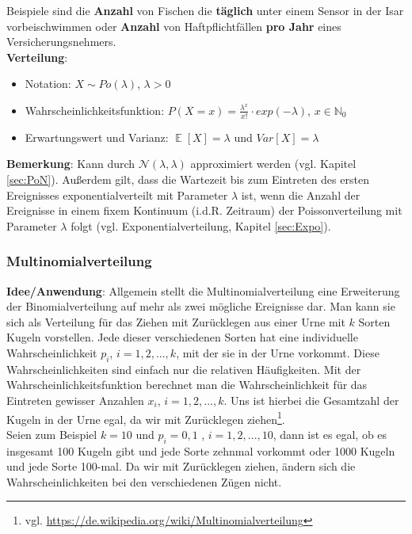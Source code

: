 \documentclass[a4paper]{article}
\DeclareMathOperator*{\E}{\mathbb{E}}
\begin{document}
\noindent Beispiele sind die \textbf{Anzahl} von Fischen die \textbf{täglich} unter einem Sensor in der Isar vorbeischwimmen oder \textbf{Anzahl} von Haftpflichtfällen \textbf{pro Jahr} eines Versicherungsnehmers. \\

\noindent \textbf{Verteilung}:
\begin{itemize}
\item[] Notation: $X\sim Po(\lambda)$, $\lambda > 0$
\item[] Wahrscheinlichkeitsfunktion: $P(X=x)=\frac{\lambda^x}{x!}\cdot exp(-\lambda)$, $x \in \mathbb{N}_0$
\item[] Erwartungswert und Varianz: $\E[X]=\lambda$ und $Var[X]=\lambda$

\end{itemize}

\noindent \textbf{Bemerkung}: Kann durch $\mathcal{N}(\lambda,\lambda)$ approximiert werden (vgl. Kapitel \ref{sec:PoN}). Außerdem gilt, dass die Wartezeit bis zum Eintreten des ersten Ereignisses exponentialverteilt mit Parameter $\lambda$ ist, wenn die Anzahl der Ereignisse in einem fixem Kontinuum (i.d.R. Zeitraum) der Poissonverteilung mit Parameter $\lambda$ folgt (vgl. Exponentialverteilung, Kapitel \ref{sec:Expo}). 

\subsubsection{Multinomialverteilung} \label{sec:Multi}

\textbf{Idee/Anwendung}: Allgemein stellt die Multinomialverteilung eine Erweiterung der Binomialverteilung auf mehr als zwei mögliche Ereignisse dar. Man kann sie sich als Verteilung für das Ziehen mit Zurücklegen aus einer Urne mit $k$ Sorten Kugeln vorstellen. Jede dieser verschiedenen Sorten hat eine individuelle Wahrscheinlichkeit $p_i$, $i=1,2,...,k$, mit der sie in der Urne vorkommt. Diese Wahrscheinlichkeiten sind einfach nur die relativen Häufigkeiten. Mit der Wahrscheinlichkeitsfunktion berechnet man die Wahrscheinlichkeit für das Eintreten gewisser Anzahlen $x_i$, $i=1,2,...,k$. Uns ist hierbei die Gesamtzahl der Kugeln in der Urne egal, da wir mit Zurücklegen ziehen\footnote{vgl. \url{https://de.wikipedia.org/wiki/Multinomialverteilung}}. \\

\noindent Seien zum Beispiel $k=10$ und $p_i=0,1$ , $i=1,2,...,10$, dann ist es egal, ob es insgesamt 100 Kugeln gibt und jede Sorte zehnmal vorkommt oder 1000 Kugeln und jede Sorte 100-mal. Da wir mit Zurücklegen ziehen, ändern sich die Wahrscheinlichkeiten bei den verschiedenen Zügen nicht. \\
\end{document}
